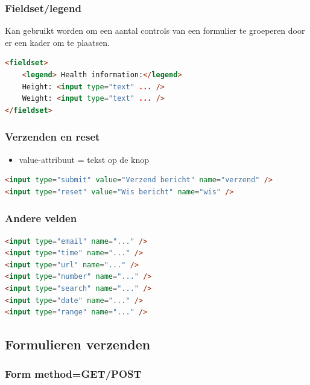 \documentclass{article}
\begin{document}
\subsubsection{Fieldset/legend}
Kan gebruikt worden om een aantal controls van een formulier te groeperen door er een kader om te plaatsen.

\begin{lstlisting}[language=HTML]
<fieldset>
    <legend> Health information:</legend>
    Height: <input type="text" ... />
    Weight: <input type="text" ... />
</fieldset>
\end{lstlisting}


\subsubsection{Verzenden en reset}
\begin{itemize}
    \item value-attribuut = tekst op de knop
\end{itemize}


\begin{lstlisting}[language=HTML]
<input type="submit" value="Verzend bericht" name="verzend" />
<input type="reset" value="Wis bericht" name="wis" />

\end{lstlisting}

\subsubsection{Andere velden}
\begin{lstlisting}[language=HTML]
<input type="email" name="..." />
<input type="time" name="..." />
<input type="url" name="..." />
<input type="number" name="..." />
<input type="search" name="..." />
<input type="date" name="..." />
<input type="range" name="..." />
\end{lstlisting}

\subsection{Formulieren verzenden}
\subsubsection{Form method=GET/POST}
\end{document}
